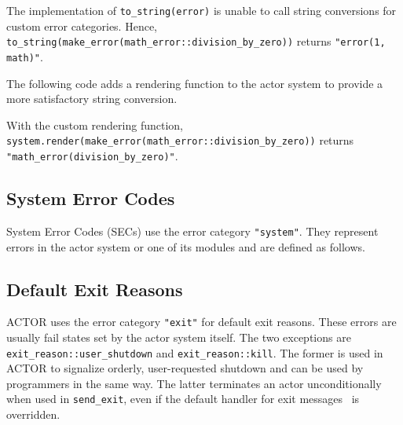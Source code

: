 
The implementation of \lstinline^to_string(error)^ is unable to call string
conversions for custom error categories. Hence,
\lstinline^to_string(make_error(math_error::division_by_zero))^ returns
\lstinline^"error(1, math)"^.

The following code adds a rendering function to the actor system to provide a
more satisfactory string conversion.


With the custom rendering function,
\lstinline^system.render(make_error(math_error::division_by_zero))^ returns
\lstinline^"math_error(division_by_zero)"^.

\clearpage
\subsection{System Error Codes}
\label{sec}

System Error Codes (SECs) use the error category \lstinline^"system"^. They
represent errors in the actor system or one of its modules and are defined as
follows.


\subsection{Default Exit Reasons}
\label{exit-reason}

ACTOR uses the error category \lstinline^"exit"^ for default exit reasons. These
errors are usually fail states set by the actor system itself. The two
exceptions are \lstinline^exit_reason::user_shutdown^ and
\lstinline^exit_reason::kill^. The former is used in ACTOR to signalize orderly,
user-requested shutdown and can be used by programmers in the same way. The
latter terminates an actor unconditionally when used in \lstinline^send_exit^,
even if the default handler for exit messages~ is overridden.

